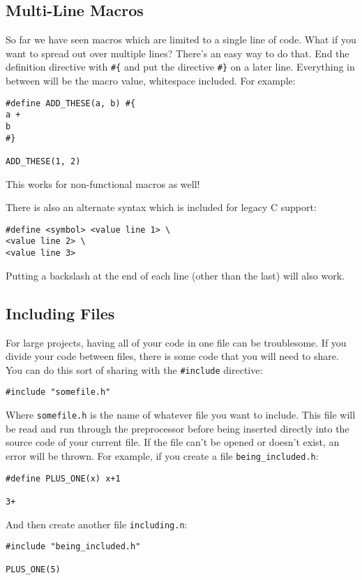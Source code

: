 \documentclass[10pt,a4paper]{article}
\begin{document}
\newpage




\subsection{Multi-Line Macros}
So far we have seen macros which are limited to a single line of code. What if you want to spread out over multiple lines? There's an easy way to do that. End the definition directive with \verb|#{| and put the directive \verb|#}| on a later line. Everything in between will be the macro value, whitespace included. For example:
\begin{verbatim}
#define ADD_THESE(a, b) #{
a +
b
#}

ADD_THESE(1, 2)
\end{verbatim}

This works for non-functional macros as well!

There is also an alternate syntax which is included for legacy C support:
\begin{verbatim}
#define <symbol> <value line 1> \
<value line 2> \
<value line 3>
\end{verbatim}
Putting a backslash at the end of each line (other than the last) will also work. 

\newpage




\subsection{Including Files}
For large projects, having all of your code in one file can be troublesome. If you divide your code between files, there is some code that you will need to share. You can do this sort of sharing with the \verb|#include| directive:
\begin{verbatim}
#include "somefile.h"
\end{verbatim}

Where \verb|somefile.h| is the name of whatever file you want to include. This file will be read and run through the preprocessor before being inserted directly into the source code of your current file. If the file can't be opened or doesn't exist, an error will be thrown. For example, if you create a file \verb|being_included.h|:
\begin{verbatim}
#define PLUS_ONE(x) x+1

3+
\end{verbatim}

And then create another file \verb|including.n|:
\begin{verbatim}
#include "being_included.h"

PLUS_ONE(5)
\end{verbatim}
\end{document}
